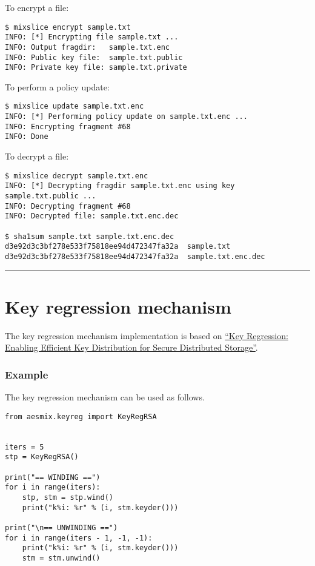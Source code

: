 To encrypt a file:

\begin{verbatim}
$ mixslice encrypt sample.txt
INFO: [*] Encrypting file sample.txt ...
INFO: Output fragdir:   sample.txt.enc
INFO: Public key file:  sample.txt.public
INFO: Private key file: sample.txt.private
\end{verbatim}

To perform a policy update:

\begin{verbatim}
$ mixslice update sample.txt.enc
INFO: [*] Performing policy update on sample.txt.enc ...
INFO: Encrypting fragment #68
INFO: Done
\end{verbatim}

To decrypt a file:

\begin{verbatim}
$ mixslice decrypt sample.txt.enc
INFO: [*] Decrypting fragdir sample.txt.enc using key sample.txt.public ...
INFO: Decrypting fragment #68
INFO: Decrypted file: sample.txt.enc.dec

$ sha1sum sample.txt sample.txt.enc.dec
d3e92d3c3bf278e533f75818ee94d472347fa32a  sample.txt
d3e92d3c3bf278e533f75818ee94d472347fa32a  sample.txt.enc.dec
\end{verbatim}

\begin{center}\rule{0.5\linewidth}{\linethickness}\end{center}

\section{Key regression mechanism}\label{key-regression-mechanism}

The key regression mechanism implementation is based on
\href{https://eprint.iacr.org/2005/303.pdf}{``Key Regression: Enabling
Efficient Key Distribution for Secure Distributed Storage''}.

\subsubsection{Example}

The key regression mechanism can be used as follows.

\begin{verbatim}
from aesmix.keyreg import KeyRegRSA


iters = 5
stp = KeyRegRSA()

print("== WINDING ==")
for i in range(iters):
    stp, stm = stp.wind()
    print("k%i: %r" % (i, stm.keyder()))

print("\n== UNWINDING ==")
for i in range(iters - 1, -1, -1):
    print("k%i: %r" % (i, stm.keyder()))
    stm = stm.unwind()
\end{verbatim}